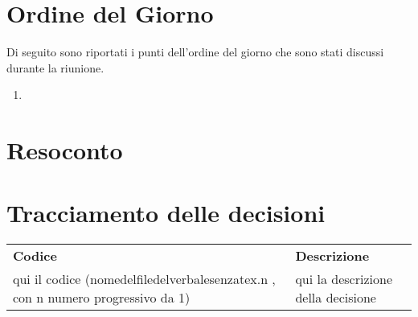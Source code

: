 \documentclass{article}
\begin{document}
\section{Ordine del Giorno}%
\label{ordine_del_giorno}
Di seguito sono riportati i punti dell'ordine del giorno che sono stati discussi durante la riunione.
\begin{enumerate}
\item 
\end{enumerate}

\section{Resoconto}%
\label{resoconto}
\paragraph*{}





\section{Tracciamento delle decisioni}
\begin{table}[H]
  \centering
  \begin{tabular}{p{4cm}|p{12cm}}
    \rowcolor{lightgray}
    \textbf{Codice}  & \textbf{Descrizione}      \\
    qui il codice (nomedelfiledelverbalesenzatex.n , con n numero progressivo da 1)    & qui la descrizione della decisione \\
  \end{tabular}
\end{table}
\end{document}

